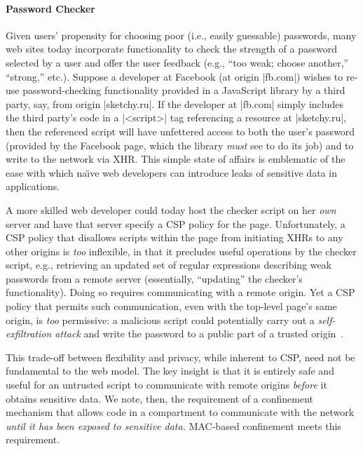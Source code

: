 \paragraph{Password Checker} Given users' propensity for choosing poor
(i.e., easily guessable) passwords, many web sites today incorporate
functionality to check the strength of a password selected by a user
and offer the user feedback (e.g., ``too weak; choose another,''
``strong,'' etc.). Suppose a developer at Facebook (at origin
\js|fb.com|) wishes to re-use password-checking functionality provided
in a JavaScript library by a third party, say, from origin
\js|sketchy.ru|. If the developer at \js|fb.com| simply includes the
third party's code in a \js|<script>| tag referencing a resource at
\js|sketchy.ru|, then the referenced script will have unfettered
access to both the user's password (provided by the Facebook page,
which the library {\em must} see to do its job) and to write to the
network via XHR. This simple state of affairs is emblematic of the
ease with which na\"{\i}ve web developers can introduce leaks of
sensitive data in applications.

A more skilled web developer could today host the checker script on
her {\em own} server and have that server specify a CSP policy for the
page.
%
Unfortunately, a CSP policy that disallows scripts within the page
from initiating XHRs to any other origins is \emph{too} inflexible, in
that it precludes useful operations by the checker script, e.g.,
retrieving an updated set of regular expressions describing weak
passwords from a remote server (essentially, ``updating'' the
checker's functionality). Doing so requires communicating with a
remote origin.
%
Yet a CSP policy that permits such communication, even with the
top-level page's same origin, is \emph{too} permissive: a malicious
script could potentially carry out a \emph{self-exfiltration attack}
and write the password to a public part of a trusted
origin~\cite{Yip:2009:PBS, selfex}.

This trade-off between flexibility and privacy, while inherent to
CSP, need not be fundamental to the web model.
%
The key insight is that it is entirely safe and useful for an untrusted script to
communicate with remote origins {\em before} it obtains sensitive
data. We note, then, the requirement of a confinement mechanism that
allows code in a compartment to communicate with the network {\em
  until it has been exposed to sensitive data.} MAC-based confinement
meets this requirement.

